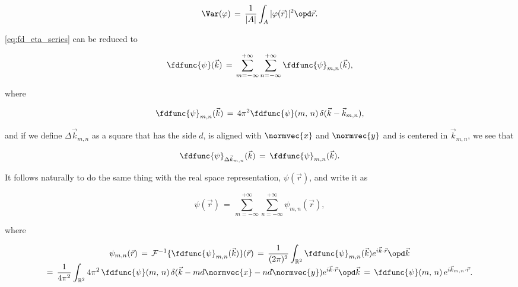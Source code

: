 {{\begin{equation} \label{eq:variance_integral}
\Var(\varphi) \,=\, \frac{1}{|A|}\int_A|\varphi(\vec{r})|^2\opd\vec{r}.
\end{equation}
}

\eqref{eq:fd_eta_series} can be reduced to

\begin{equation} \label{eq:fd_eta_series_reduced}
\fdfunc{\psi}(\vec{k}) \,=\, \sum_{m=-\infty}^{+\infty}\sum_{n=-\infty}^{+\infty} \fdfunc{\psi}_{m,n}(\vec{k}),
\end{equation}

where

\begin{equation} \label{eq:fd_eta_mn_definition}
\fdfunc{\psi}_{m,n}(\vec{k}) \,=\, 4\pi^2 \fdfunc{\psi}(m,\,n)\,\delta(\vec{k} - \vec{k}_{m,n}),
\end{equation}

and if we define $\Delta\vec{k}_{m,n}$ as a square that has the side $d$, is aligned with $\normvec{x}$ and $\normvec{y}$ and is centered in $\vec{k}_{m,n}$, we see that

\begin{equation} \label{eq:fd_eta_dk_mn_definition}
\fdfunc{\psi}_{\Delta\vec{k}_{m,n}}(\vec{k}) \,=\, \fdfunc{\psi}_{m,n}(\vec{k}).
\end{equation}

It follows naturally to do the same thing with the real space representation, $\psi(\vec{r})$, and write it as

\begin{equation} \label{eq:eta_series_reduced}
\psi(\vec{r}) \,=\, \sum_{m=-\infty}^{+\infty}\sum_{n=-\infty}^{+\infty} \psi_{m,n}(\vec{r}),
\end{equation}

where

\begin{equation} \label{eq:eta_mn_definition}
\renewcommand*{\arraystretch}{1.5}
\begin{array}{c}
\displaystyle \psi_{m,n}(\vec{r}) \,=\, \mathcal{F}^{-1}\{\fdfunc{\psi}_{m,n}(\vec{k})\}(\vec{r}) \,=\, \frac{1}{(2\pi)^2} \int_{\mathbb{R}^2} \fdfunc{\psi}_{m,n}(\vec{k}) e^{i\vec{k}\cdot\vec{r}}\opd \vec{k} \\
\displaystyle =\, \frac{1}{4\pi^2} \int_{\mathbb{R}^2} 4\pi^2\,\fdfunc{\psi}(m,\,n)\,\delta(\vec{k} - md\normvec{x} - nd\normvec{y}) e^{i\vec{k}\cdot\vec{r}}\opd \vec{k} \,=\, \fdfunc{\psi}(m,\,n)\,e^{i\vec{k}_{m,n}\cdot\vec{r}}.
\end{array}
\end{equation}

}
